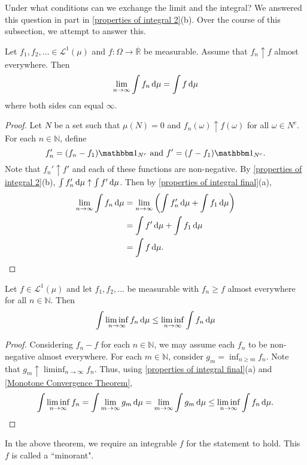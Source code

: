 Under what conditions can we exchange the limit and the integral? We answered this question in part in \cref{properties of integral 2}(b). Over the course of this subsection, we attempt to answer this.

\begin{theorem}
\label{Monotone Convergence Theorem}
Let $f_1,f_2,\ldots\in\mathcal{L}^1(\mu)$ and $f:\Omega\to\overline{\mathbb{R}}$ be measurable. Assume that $f_n\uparrow f$ almost everywhere. Then
$$\lim_{n\to\infty}\int f_n\operatorname{d}\!{\mu} = \int f\operatorname{d}\!{\mu}$$
where both sides can equal $\infty$.
\end{theorem}
\begin{proof}
    Let $N$ be a set such that $\mu(N)=0$ and $f_n(\omega)\uparrow f(\omega)$ for all $\omega\in N^c$. For each $n\in\mathbb{N}$, define
    $$f_n'=(f_n-f_1)\indic_{N^c}\text{ and }f'=(f-f_1)\indic_{N^c}.$$
    Note that $f_n'\uparrow f'$ and each of these functions are non-negative. By \cref{properties of integral 2}(b), $\int f_n'\operatorname{d}\!{\mu}\uparrow\int f'\operatorname{d}\!{\mu}$. Then by \cref{properties of integral final}(a),
    \begin{align*}
        \lim_{n\to\infty} \int f_n\operatorname{d}\!{\mu} &= \lim_{n\to\infty}\left(\int f_n'\operatorname{d}\!{\mu} + \int f_1\operatorname{d}\!{\mu}\right) \\
        &= \int f'\operatorname{d}\!{\mu} + \int f_1\operatorname{d}\!{\mu} \\
        &= \int f\operatorname{d}\!{\mu}.
    \end{align*}
\end{proof}

\begin{theorem}
\label{fatous lemma}
    Let $f\in\mathcal{L}^1(\mu)$ and let $f_1,f_2,\ldots$ be measurable with $f_n\geq f$ almost everywhere for all $n\in\mathbb{N}$. Then
    $$\int \liminf_{n\to\infty} f_n\operatorname{d}\!{\mu} \leq \liminf_{n\to \infty} \int f_n\operatorname{d}\!{\mu}$$
\end{theorem}
\begin{proof}
    Considering $f_n-f$ for each $n\in\mathbb{N}$, we may assume each $f_n$ to be non-negative almost everywhere. For each $m\in\mathbb{N}$, consider $g_m=\inf_{n\geq m}f_n$. Note that $g_m\uparrow \liminf_{n\to\infty} f_n$. Thus, using \cref{properties of integral final}(a) and \cref{Monotone Convergence Theorem},
    $$\int \liminf_{n\to\infty} f_n = \int \lim_{m\to\infty} g_m\operatorname{d}\!{\mu} = \lim_{m\to\infty}\int g_m\operatorname{d}\!{\mu} \leq \liminf_{n\to\infty}\int f_n\operatorname{d}\!{\mu}.$$
\end{proof}

In the above theorem, we require an integrable $f$ for the statement to hold. This $f$ is called a ``minorant".

